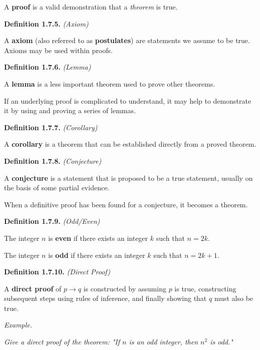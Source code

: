\documentclass[12pt, letterpaper]{article}
\begin{document}
A \textbf{proof} is a valid demonstration that a \textit{theorem} is true.
\medskip

\bigskip
\bigskip

\textbf{Definition 1.7.5.} \textit{(Axiom)}
\medskip

A \textbf{axiom} (also referred to as \textbf{postulates}) are statements we assume to be true. Axioms may be used within proofs.

\bigskip
\bigskip

\textbf{Definition 1.7.6.} \textit{(Lemma)}
\medskip

A \textbf{lemma} is a less important theorem used to prove other theorems.
\medskip

If an underlying proof is complicated to understand, it may help to demonstrate it by using and proving a series of lemmas.

\bigskip
\bigskip

\textbf{Definition 1.7.7.} \textit{(Corollary)}
\medskip

A \textbf{corollary} is a theorem that can be established directly from a proved theorem.

\bigskip
\bigskip

\textbf{Definition 1.7.8.} \textit{(Conjecture)}
\medskip

A \textbf{conjecture} is a statement that is proposed to be a true statement, usually on the basis of some partial evidence.
\medskip

When a definitive proof has been found for a conjecture, it becomes a theorem.

\bigskip
\bigskip

\textbf{Definition 1.7.9.} \textit{(Odd/Even)}
\medskip

The integer $ n $ is \textbf{even} if there exists an integer $ k $ such that $ n = 2k $.
\medskip

The integer $ n $ is \textbf{odd} if there exists an integer $ k $ such that $ n = 2k + 1 $.

\bigskip
\bigskip

\textbf{Definition 1.7.10.} \textit{(Direct Proof)}
\medskip

A \textbf{direct proof} of $ p \rightarrow q $ is constructed by assuming $ p $ is true, constructing subsequent steps using rules of inference, and finally showing that $ q $ must also be true.
\bigskip

\textit{Example.}
\medskip

\textit{Give a direct proof of the theorem: "If $ n $ is an odd integer, then $ n^2 $ is odd."}
\medskip
\end{document}
